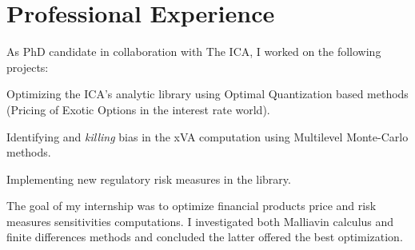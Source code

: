 \documentclass[]{deedy-resume-openfont}
\begin{document}
\begin{minipage}[t]{0.64\textwidth}




\vspace{\topsep}
\section{Professional Experience}

As PhD candidate in collaboration with The ICA, I worked on the following projects:
\begin{tightemize}
\item Optimizing the ICA's analytic library using Optimal Quantization based methods (Pricing of Exotic Options in the interest rate world).
\item Identifying and \textit{killing} bias in the xVA computation using Multilevel Monte-Carlo methods.
\item Implementing new regulatory risk measures in the library.
\end{tightemize}

\sectionsep

The goal of my internship was to optimize financial products price and risk measures sensitivities computations. I investigated both Malliavin calculus and finite differences methods and concluded the latter offered the best optimization.  
\sectionsep


\end{minipage}
\end{document}
